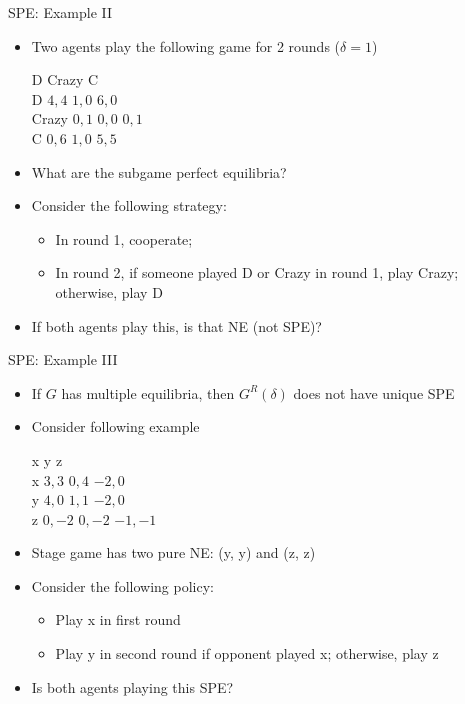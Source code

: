 \documentclass[11pt,aspectratio=169,handout]{beamer}
\begin{document}
  \begin{frame}{SPE: Example II}
   \begin{itemize}[<+->]
    \item Two agents play the following game for 2 rounds ($\delta = 1$)
    \begin{center}
     \hspace{-3.5em}
     \begin{game}{3}{3}
      		\> D			\> Crazy		\> C			\\
      D		\> $4, 4$	\> $1, 0$	\> $6, 0$	\\
      Crazy	\> $0, 1$	\> $0, 0$	\> $0, 1$	\\
      C		\> $0, 6$	\> $1, 0$	\> $5, 5$
     \end{game}
    \end{center}
    \vspace{0.7em}  
    \item What are the subgame perfect equilibria?
    \item Consider the following strategy:
    \begin{itemize}[<.->]
     \item In round 1, cooperate;
     \item In round 2, if someone played D or Crazy in round 1, play Crazy; otherwise, play D
    \end{itemize}
    \item If both agents play this, is that NE (not SPE)?
   \end{itemize}
  \end{frame} 
  
  
  \begin{frame}{SPE: Example III}
   \begin{itemize}
    \item  If $G$ has multiple equilibria, then $G^{R}(\delta)$ does not have unique SPE
    \item Consider following example
    \begin{center}
     \hspace{-3.5em}
     \begin{game}{3}{3}
      	\> x			\> y			\> z			\\
      x	\> $3, 3$	\> $0, 4$	\> $-2, 0$	\\
      y	\> $4, 0$	\> $1, 1$	\> $-2, 0$	\\
      z	\> $0, -2$	\> $0, -2$	\> $-1, -1$
     \end{game}
    \end{center}
    \vspace{0.7em}
    \item Stage game has two pure NE: (y, y) and (z, z)
    \item Consider the following policy:
    \begin{itemize}
     \item Play x in first round
     \item Play y in second round if opponent played x; otherwise, play z
    \end{itemize}
    \item Is both agents playing this SPE?
   \end{itemize}  
  \end{frame}
\end{document}
